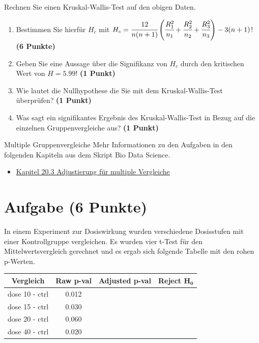 \documentclass[a4paper, 10pt]{scrartcl}\usepackage[]{graphicx}\usepackage[]{xcolor}
\begin{document}
Rechnen Sie einen Kruskal-Wallis-Test auf den obigen Daten.

\begin{enumerate}
\item Bestimmen Sie hierf{\"u}r $H_c$ mit $H_c =
  \cfrac{12}{n(n+1)}\left(\cfrac{R_1^2}{n_1}+\cfrac{R_2^2}{n_2}
    + \cfrac{R_3^2}{n_3}\right)
  - 3(n+1)$! \textbf{(6 Punkte)} 
\item Geben Sie eine Aussage {\"u}ber die Signifikanz von $H_c$ durch
  den kritischen Wert von $H = 5.99$! \textbf{(1 Punkt)}
\item Wie lautet die Nullhypothese die Sie mit dem Kruskal-Wallis-Test
  {\"u}berpr{\"u}fen? \textbf{(1 Punkt)}
\item Was sagt ein signifikantes Ergebnis des Kruskal-Wallis-Test in Bezug
  auf die einzelnen Gruppenvergleiche aus? \textbf{(1 Punkt)}
\end{enumerate} 
\clearpage
\begin{graybox}{Multiple Gruppenvergleiche}
Mehr Informationen zu den Aufgaben in den folgenden Kapiteln aus dem Skript Bio Data Science.
  \begin{itemize}
  \item \href{https://jkruppa.github.io/stat-tests-theorie.html#sec-statistisches-testen-alpha-adjust}{Kapitel 20.3 Adjustierung für multiple Vergleiche}
  \end{itemize}
\end{graybox}

\section{Aufgabe \hfill (6 Punkte)}

In einem Experiment zur Dosiswirkung wurden verschiedene Dosisstufen mit
einer Kontrollgruppe vergleichen. Es wurden vier t-Test f{\"u}r den
Mittelwertsvergleich gerechnet und es ergab sich folgende Tabelle mit den
rohen p-Werten.



\begin{center}
  \Large
  \begin{tabular}{c|c|c|c}
    \textbf{Vergleich} & \textbf{Raw p-val} & \textbf{Adjusted p-val} &
                                                                        \textbf{Reject $\boldsymbol{H_0}$} \strut\\
    \hline
    dose 10 - ctrl  & 0.012 &  &\strut\\
    \hline
    dose 15 - ctrl  & 0.030 & &\strut\\
    \hline
    dose 20 - ctrl  & 0.060 & &\strut\\
    \hline
    dose 40 - ctrl  & 0.020 & &\strut\\
  \end{tabular}
\end{center}
\end{document}

